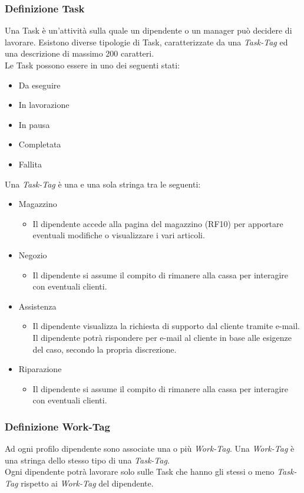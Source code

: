 \documentclass{report}
\begin{document}
\subsubsection*{Definizione Task}

Una Task è un'attività sulla quale un dipendente o un manager può decidere di lavorare. Esistono diverse tipologie di Task, caratterizzate da una \textit{Task-Tag} ed una descrizione di massimo 200 caratteri.\\
Le Task possono essere in uno dei seguenti stati: 
\begin{itemize}
	\item Da eseguire
	\item In lavorazione
	\item In pausa
	\item Completata
	\item Fallita
\end{itemize}
Una \textit{Task-Tag} è una e una sola stringa tra le seguenti:
\begin{itemize}
	\item Magazzino
	\begin{itemize}
		\item Il dipendente accede alla pagina del magazzino (RF10) per apportare eventuali modifiche o visualizzare i vari articoli.
	\end{itemize}
	\item Negozio
	\begin{itemize}
		\item Il dipendente si assume il compito di rimanere alla cassa per interagire con eventuali clienti.
	\end{itemize}
	\item Assistenza
	\begin{itemize}
		\item Il dipendente visualizza la richiesta di supporto dal cliente tramite e-mail. Il dipendente potrà rispondere per e-mail al cliente in base alle esigenze del caso, secondo la propria discrezione.
	\end{itemize}
	\item Riparazione
	\begin{itemize}
		\item Il dipendente si assume il compito di rimanere alla cassa per interagire con eventuali clienti.
	\end{itemize}
\end{itemize}

\subsubsection*{Definizione Work-Tag}
Ad ogni profilo dipendente sono associate una o più \textit{Work-Tag}. Una \textit{Work-Tag} è una stringa dello stesso tipo di una \textit{Task-Tag}.\\
Ogni dipendente potrà lavorare solo sulle Task che hanno gli stessi o meno \textit{Task-Tag} rispetto ai \textit{Work-Tag} del dipendente.
\end{document}
